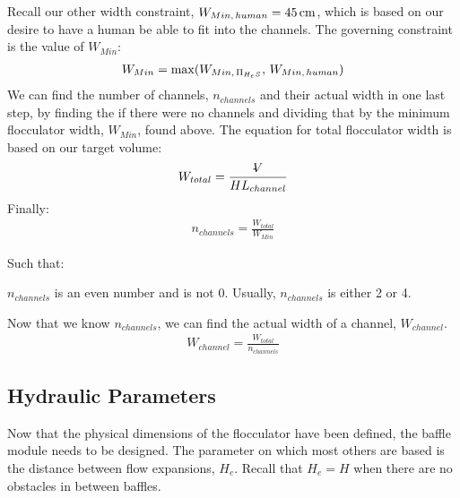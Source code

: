 \documentclass[letterpaper,10pt,english]{sphinxmanual}
\begin{document}
Recall our other width constraint, \(W_{Min, \, human} = 45 \, {\rm cm}\), which is based on our desire to have a human be able to fit into the channels. The governing constraint is the  value of \(W_{Min}\):
\begin{equation}\label{equation:Flocculation/Floc_Design:Flocculation/Floc_Design:21}
\begin{split}W_{Min} = {\rm max}(W_{Min, \, \Pi_{H_eS}}, \, W_{Min, \, human})\end{split}
\end{equation}
We can find the number of channels, \(n_{channels}\) and their actual width in one last step, by finding the  if there were no channels and dividing that by the minimum flocculator width, \(W_{Min}\), found above. The equation for total flocculator width is based on our target volume:
\begin{equation}\label{equation:Flocculation/Floc_Design:Flocculation/Floc_Design:22}
\begin{split}W_{total} = \frac{\rlap{-} V}{H L_{channel}}\end{split}
\end{equation}
Finally:
\begin{equation}\label{equation:Flocculation/Floc_Design:Flocculation/Floc_Design:23}
\begin{split}n_{channels} = \frac{W_{total}}{W_{Min}}\end{split}
\end{equation}
\begin{DUlineblock}{0em}
\item[] Such that:
\item[] \(n_{channels}\) is an even number and is not 0. Usually, \(n_{channels}\) is either 2 or 4.
\end{DUlineblock}

Now that we know \(n_{channels}\), we can find the actual width of a channel, \(W_{channel}\).
\begin{equation}\label{equation:Flocculation/Floc_Design:Flocculation/Floc_Design:24}
\begin{split}W_{channel} = \frac{W_{total}}{n_{channels}}\end{split}
\end{equation}

\subsection{Hydraulic Parameters}
\label{\detokenize{Flocculation/Floc_Design:hydraulic-parameters}}
Now that the physical dimensions of the flocculator have been defined, the baffle module needs to be designed. The parameter on which most others are based is the distance between flow expansions, \(H_e\). Recall that \(H_e = H\) when there are no obstacles in between baffles.
\end{document}
